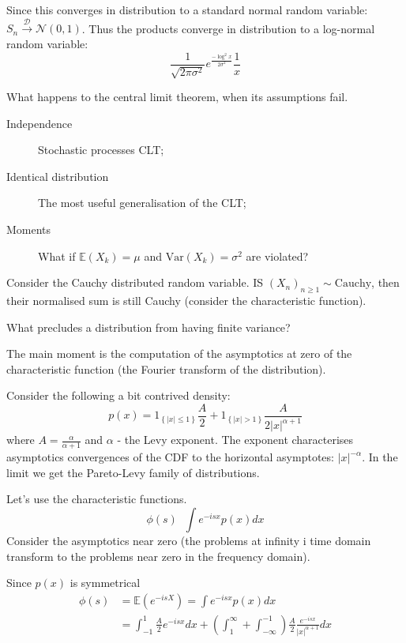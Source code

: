 \documentclass[a4paper]{article}
\newcommand{\obj}[1]{{\left\{ #1 \right \}}}
\newcommand{\brac}[1]{{\left ( #1 \right )}}
\newcommand{\abs}[1]{{\left | #1 \right |}}
\newcommand{\ex}{\mathbb{E}}
\newcommand{\defn}{\mathop{\overset{\Delta}{=}}\nolimits}
\begin{document}
Since this converges in distribution to a standard normal random variable: $S_n \overset{\mathcal{D}}{\to} \mathcal{N}(0,1)$. Thus the products converge in distribution to a log-normal random variable:
\[\frac{1}{\sqrt{2\pi\sigma^2}} e^\frac{-\log^2 x}{2\sigma^2}\frac{1}{x}\]

What happens to the central limit theorem, when its assumptions fail.
\begin{description}
	\item[Independence] Stochastic processes CLT;
	\item[Identical distribution] The most useful generalisation of the CLT;
	\item[Moments] What if $\ex(X_k) = \mu$ and $\text{Var}(X_k) = \sigma^2$ are violated?
\end{description}

Consider the Cauchy distributed random variable. IS $\brac{X_n}_{n\geq1}\sim \text{Cauchy}$, then their normalised sum is still Cauchy (consider the characteristic function).

What precludes a distribution from having finite variance?

The main moment is the computation of the asymptotics at zero of the characteristic function (the Fourier transform of the distribution).

Consider the following a bit contrived density:
\[p(x) = 1_\obj{\abs{x}\leq 1}\frac{A}{2} + 1_\obj{\abs{x}>1}\frac{A}{2\abs{x}^{\alpha+1}}\]
where $A=\frac{\alpha}{\alpha+1}$ and $\alpha$ - the Levy exponent. The exponent characterises asymptotics convergences of the CDF to the horizontal asymptotes: $\abs{x}^{-\alpha}$. In the limit we get the Pareto-Levy family of distributions.

Let's use the characteristic functions.
\[\phi(s)\defn\int e^{-isx}p(x)dx\]
Consider the asymptotics near zero (the problems at infinity i time domain transform to the problems near zero in the frequency domain).

Since $p(x)$ is symmetrical
\begin{align*}
	\phi(s) &= \ex\brac{e^{-isX} } = \int e^{-isx}p(x)dx \\
	&= \int_{-1}^1 \frac{A}{2} e^{-isx} dx + \brac{\int_1^\infty + \int_{-\infty}^{-1}} \frac{A}{2} \frac{e^{-isx} }{\abs{x}^{\alpha+1}} dx
\end{align*}
\end{document}
